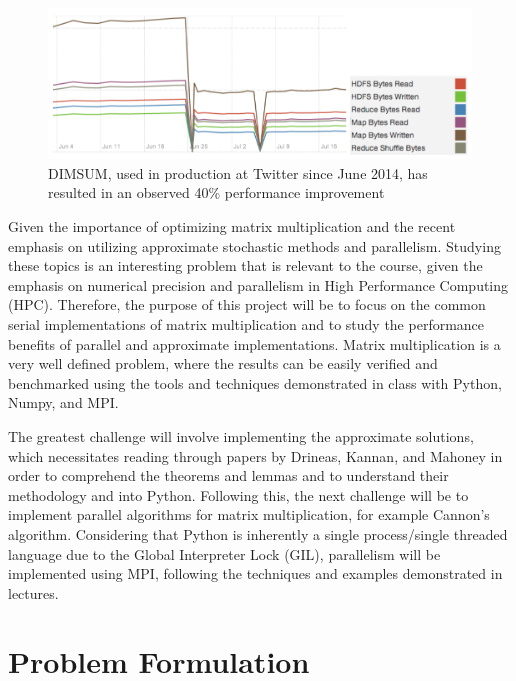 \documentclass[oneside]{article}
\begin{document}
\begin{figure}[ht!]
\centering
\includegraphics[width=\textwidth]{figures/twitter-dimsum}
\caption{DIMSUM, used in production at Twitter since June 2014, has resulted in an observed 40\% performance improvement\cite{zadeh2013dimension}}
\label{fig:transaction}
\end{figure}


Given the importance of optimizing matrix multiplication and the recent emphasis on utilizing approximate stochastic methods and parallelism. Studying these topics is an interesting problem that is relevant to the course, given the emphasis on numerical precision and parallelism in High Performance Computing (HPC). Therefore, the purpose of this project will be to focus on the common serial implementations of matrix multiplication and to study the performance benefits of parallel and approximate implementations. Matrix multiplication is a very well defined problem, where the results can be easily verified and benchmarked using the tools and techniques demonstrated in class with Python, Numpy, and MPI\cite{van2011numpy}.

The greatest challenge will involve implementing the approximate solutions, which necessitates reading through papers by Drineas, Kannan, and Mahoney in order to comprehend the theorems and lemmas and to understand their methodology and into Python. Following this, the next challenge will be to implement parallel algorithms for matrix multiplication, for example Cannon's algorithm. Considering that Python is inherently a single process/single threaded language due to the Global Interpreter Lock (GIL)\cite{beazley2010understanding}, parallelism will be implemented using MPI, following the techniques and examples demonstrated in lectures.




\section{Problem Formulation}
\end{document}
